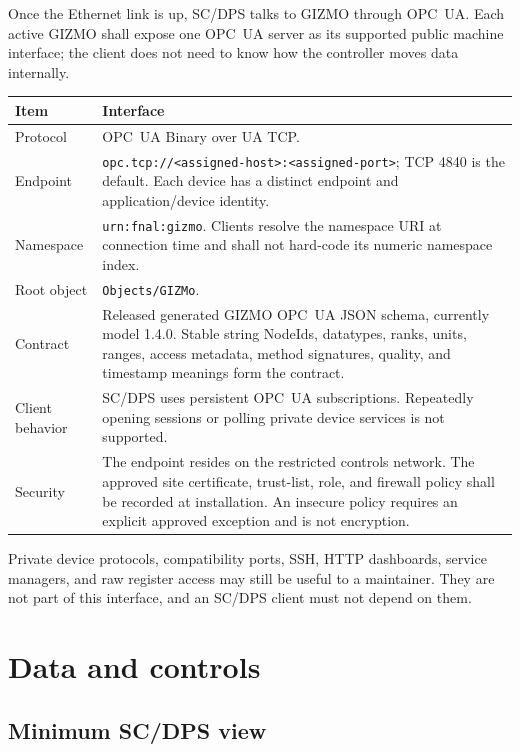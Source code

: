 \documentclass{cernatlasnote}
\newcommand{\code}[1]{\nolinkurl{#1}}
\begin{document}
Once the Ethernet link is up, SC/DPS talks to GIZMO through OPC~UA. Each active
GIZMO shall expose one OPC~UA server as its supported public machine interface;
the client does not need to know how the controller moves data internally.

\begin{longtable}{L{0.25\textwidth} L{0.65\textwidth}}
\toprule
\textbf{Item} & \textbf{Interface} \\
\midrule
Protocol & OPC~UA Binary over UA TCP. \\
Endpoint & \code{opc.tcp://<assigned-host>:<assigned-port>}; TCP 4840 is the
default. Each device has a distinct endpoint and application/device identity. \\
Namespace & \code{urn:fnal:gizmo}. Clients resolve the namespace URI at
connection time and shall not hard-code its numeric namespace index. \\
Root object & \code{Objects/GIZMo}. \\
Contract & Released generated GIZMO OPC~UA JSON schema, currently model 1.4.0.
Stable string NodeIds, datatypes, ranks, units, ranges, access metadata, method
signatures, quality, and timestamp meanings form the contract. \\
Client behavior & SC/DPS uses persistent OPC~UA subscriptions. Repeatedly opening
sessions or polling private device services is not supported. \\
Security & The endpoint resides on the restricted controls network. The
approved site certificate, trust-list, role, and firewall policy shall be
recorded at installation. An insecure policy requires an explicit approved
exception and is not encryption. \\
\bottomrule
\end{longtable}

Private device protocols, compatibility ports, SSH, HTTP dashboards, service
managers, and raw register access may still be useful to a maintainer. They are
not part of this interface, and an SC/DPS client must not depend on them.

\section{Data and controls}

\subsection{Minimum SC/DPS view}
\end{document}
